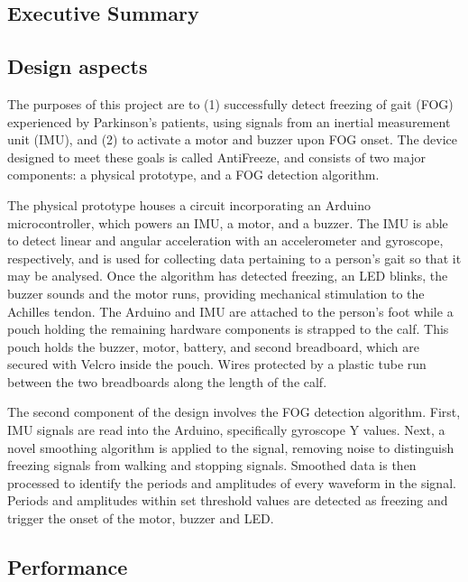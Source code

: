 \documentclass[titlepage]{article}
\begin{document}
\begin{doublespacing}

\clearpage
\section{Executive Summary}
\subsection{Design aspects}

The purposes of this project are to (1) successfully detect freezing of gait (FOG) experienced by Parkinson's patients, using signals from an inertial measurement unit (IMU), and (2) to activate a motor and buzzer upon FOG onset. The device designed to meet these goals is called AntiFreeze, and consists of two major components: a physical prototype, and a FOG detection algorithm. 

The physical prototype houses a circuit incorporating an Arduino microcontroller, which powers an IMU, a motor, and a buzzer. The IMU is able to detect linear and angular acceleration with an accelerometer and gyroscope, respectively, and is used for collecting data pertaining to a person's gait so that it may be analysed. Once the algorithm has detected freezing, an LED blinks, the buzzer sounds and the motor runs, providing mechanical stimulation to the Achilles tendon. The Arduino and IMU are attached to the person's foot while a pouch holding the remaining hardware components is strapped to the calf. This pouch holds the buzzer, motor, battery, and second breadboard, which are secured with Velcro inside the pouch. Wires protected by a plastic tube run between the two breadboards along the length of the calf. 

The second component of the design involves the FOG detection algorithm. First, IMU signals are read into the Arduino, specifically gyroscope Y values. Next, a novel smoothing algorithm is applied to the signal, removing noise to distinguish freezing signals from walking and stopping signals. Smoothed data is then processed to identify the periods and amplitudes of every waveform in the signal. Periods and amplitudes within set threshold values are detected as freezing and trigger the onset of the motor, buzzer and LED. 

\subsection{Performance}


\end{doublespacing}
\end{document}
